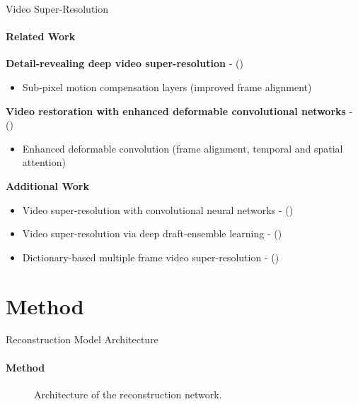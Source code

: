 \documentclass[
	ngerman,
	aspectratio=169,
	color={accentcolor=3d},
	logo=false,
	colorframetitle=true,
	]{tudabeamer}
\begin{document}
\begin{frame}{Video Super-Resolution}
\framesubtitle{Related Work}
\textbf{Detail-revealing deep video super-resolution} - \citet{valillasuperres} (\citeyear{valillasuperres})
\begin{itemize}
    \item Sub-pixel motion compensation layers (improved frame alignment)
\end{itemize}

\vspace{0.5cm}

\textbf{Video restoration with enhanced deformable convolutional networks} - \citet{deformablesuperres} (\citeyear{deformablesuperres})
\begin{itemize}
    \item Enhanced deformable convolution (frame alignment, temporal and spatial attention)
\end{itemize}

\vspace{0.5cm}

\pause

\textbf{Additional Work}
\begin{itemize}
    \item Video super-resolution with convolutional neural networks - \citet{videosuperrescnn} (\citeyear{videosuperrescnn})
    \item Video super-resolution via deep draft-ensemble learning - \citet{videosuperresdraft} (\citeyear{videosuperresdraft})
    \item Dictionary-based multiple frame video super-resolution - \citet{videosuperresdict} (\citeyear{videosuperresdict})
\end{itemize}
\end{frame}


\section{Method}

\begin{frame}{Reconstruction Model Architecture}
\framesubtitle{Method}
\vspace{1cm}
\begin{figure}[h!]
    \centering
    
    \caption{Architecture of the reconstruction network.}
    \label{fig:reconstructionnetwork}
\end{figure}
\end{frame}
\end{document}
